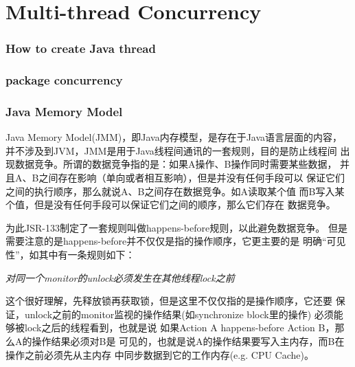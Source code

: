 \documentclass[a4paper,11pt]{article}
\begin{document}
\part[Multi-thread and Concurrency]{Multi-thread Concurrency}
\section[How to create Java thread]{How to create Java thread}

\section[package: concurrency]{package concurrency}



\section[Java Memory Model]{Java Memory Model}
Java Memory Model(JMM)，即Java内存模型，是存在于Java语言层面的内容，
并不涉及到JVM，JMM是用于Java线程间通讯的一套规则，目的是防止线程间
出现数据竞争。所谓的数据竞争指的是：如果A操作、B操作同时需要某些数据，
并且A、B之间存在影响（单向或者相互影响），但是并没有任何手段可以
保证它们之间的执行顺序，那么就说A、B之间存在数据竞争。如A读取某个值
而B写入某个值，但是没有任何手段可以保证它们之间的顺序，那么它们存在
数据竞争。

为此JSR-133制定了一套规则叫做happens-before规则，以此避免数据竞争。
但是需要注意的是happens-before并不仅仅是指的操作顺序，它更主要的是
明确“可见性”，如其中有一条规则如下：

\emph{对同一个monitor的unlock必须发生在其他线程lock之前}

这个很好理解，先释放锁再获取锁，但是这里不仅仅指的是操作顺序，它还要
保证，unlock之前的monitor监视的操作结果(如synchronize block里的操作)
必须能够被lock之后的线程看到，也就是说
如果Action A happens-before Action B，那么A的操作结果必须对B是
可见的，也就是说A的操作结果要写入主内存，而B在操作之前必须先从主内存
中同步数据到它的工作内存(e.g. CPU Cache)。
\end{document}
